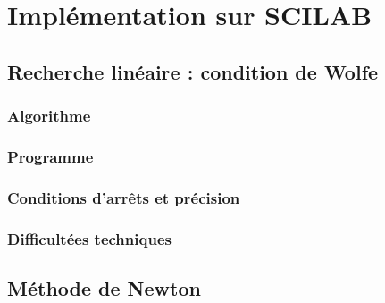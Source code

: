 \documentclass[3p, twocolumn]{elsarticle}
\begin{document}
\section{Implémentation sur SCILAB}
\subsection{Recherche linéaire : condition de Wolfe}
\subsubsection{Algorithme}
\subsubsection{Programme}
\subsubsection{Conditions d'arrêts et précision}
\subsubsection{Difficultées techniques}
\subsection{Méthode de Newton}
\end{document}
